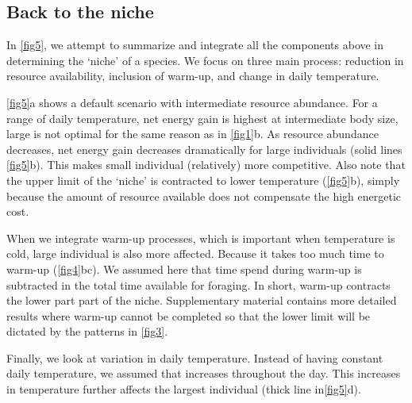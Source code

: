 \subsection*{Back to the niche}
In \cref{fig5}, we attempt to summarize and integrate all the components above in determining the `niche' of a species.
We focus on three main process: reduction in resource availability, inclusion of warm-up, and change in daily temperature.

\cref{fig5}a shows a default scenario with intermediate resource abundance.
For a range of daily temperature, net energy gain is highest at intermediate body size, large is not optimal for the same reason as in \cref{fig1}b.
As resource abundance decreases, net energy gain decreases dramatically for large individuals (solid lines \cref{fig5}b).
This makes small individual (relatively) more competitive.
Also note that the upper limit of the `niche' is contracted to lower temperature (\cref{fig5}b), simply because the amount of resource available does not compensate the high energetic cost.

When we integrate warm-up processes, which is important when temperature is cold, large individual is also more affected.
Because it takes too much time to warm-up (\cref{fig4}bc).
We assumed here that time spend during warm-up is subtracted in the total time available for foraging.
In short, warm-up contracts the lower part part of the niche.
Supplementary material contains more detailed results where warm-up cannot be completed so that the lower limit will be dictated by the patterns in \cref{fig3}.

Finally, we look at variation in daily temperature.
Instead of having constant daily temperature, we assumed that increases throughout the day.
This increases in temperature further affects the largest individual (thick line in\cref{fig5}d).

